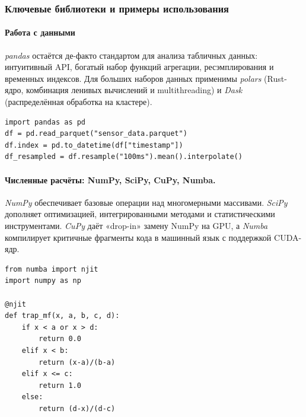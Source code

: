 \subsubsection{Ключевые библиотеки и примеры использования}

\paragraph{Работа с данными}

\emph{pandas} остаётся де-факто стандартом для анализа табличных данных:
интуитивный API, богатый набор функций агрегации, ресэмплирования
и временных индексов.  
Для больших наборов данных применимы \emph{polars} (Rust-ядро,
комбинация ленивых вычислений и multithreading) и \emph{Dask}
(распределённая обработка на кластере).
\begin{center}
  \label{lst:pandas_resample}
  \medskip
  \begin{verbatim}
import pandas as pd
df = pd.read_parquet("sensor_data.parquet")
df.index = pd.to_datetime(df["timestamp"])
df_resampled = df.resample("100ms").mean().interpolate()
  \end{verbatim}
\end{center}

\newpage
\paragraph{Численные расчёты: NumPy, SciPy, CuPy, Numba.}

\emph{NumPy} обеспечивает базовые операции над многомерными массивами.
\emph{SciPy} дополняет оптимизацией, интегрированными методами и
статистическими инструментами.  
\emph{CuPy} даёт «drop-in» замену NumPy на GPU,
а \emph{Numba} компилирует критичные фрагменты кода в машинный язык
с поддержкой CUDA-ядр.


\begin{center}
  \medskip
  \begin{verbatim}
from numba import njit
import numpy as np

@njit
def trap_mf(x, a, b, c, d):
    if x < a or x > d:
        return 0.0
    elif x < b:
        return (x-a)/(b-a)
    elif x <= c:
        return 1.0
    else:
        return (d-x)/(d-c)
  \end{verbatim}
\end{center}

